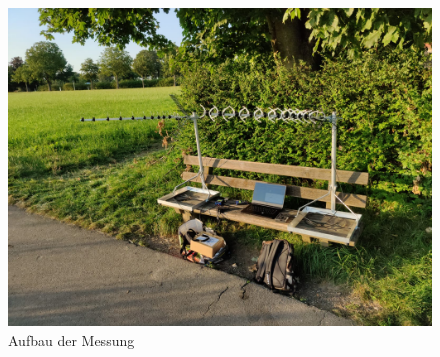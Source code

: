 \begin{figure}
    \centering
    \includegraphics[width=\textwidth]{images/Messaufbau.jpg}
    \caption{Aufbau der Messung}\label{fig:Messaufbau}
\end{figure}
